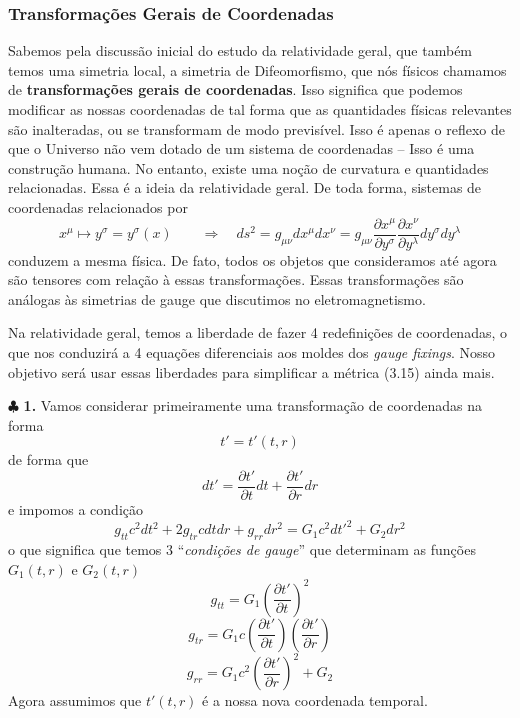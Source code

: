 \documentclass[11pt]{article}
\begin{document}
    \hypertarget{transformauxe7uxf5es-gerais-de-coordenadas}{%
\subsubsection{Transformações Gerais de
Coordenadas}\label{transformauxe7uxf5es-gerais-de-coordenadas}}

    Sabemos pela discussão inicial do estudo da relatividade geral, que
também temos uma simetria local, a simetria de Difeomorfismo, que nós
físicos chamamos de \textbf{transformações gerais de coordenadas}. Isso
significa que podemos modificar as nossas coordenadas de tal forma que
as quantidades físicas relevantes são inalteradas, ou se transformam de
modo previsível. Isso é apenas o reflexo de que o Universo não vem
dotado de um sistema de coordenadas -- Isso é uma construção humana. No
entanto, existe uma noção de curvatura e quantidades relacionadas. Essa
é a ideia da relatividade geral. De toda forma, sistemas de coordenadas
relacionados por
\[ \tag{3.16} x^\mu \mapsto y^\sigma = y^\sigma(x) \qquad \Rightarrow \quad ds^2 = g_{\mu\nu} dx^\mu dx^\nu = g_{\mu\nu} \frac{\partial x^\mu}{\partial y^\sigma} \frac{\partial x^\nu}{\partial y^\lambda} dy^\sigma dy^\lambda \]
conduzem a mesma física. De fato, todos os objetos que consideramos até
agora são tensores com relação à essas transformações. Essas
transformações são análogas às simetrias de gauge que discutimos no
eletromagnetismo.

Na relatividade geral, temos a liberdade de fazer 4 redefinições de
coordenadas, o que nos conduzirá a 4 equações diferenciais aos moldes
dos \emph{gauge fixings}. Nosso objetivo será usar essas liberdades para
simplificar a métrica (3.15) ainda mais.

    \(\clubsuit\) \textbf{1.} Vamos considerar primeiramente uma
transformação de coordenadas na forma \[ \tag{3.16.a} t' = t'(t,r) \] de
forma que
\[ \tag{3.16.b} dt' = \frac{\partial t'}{\partial t} dt +  \frac{\partial t'}{\partial r} dr \]
e impomos a condição
\[ \tag{3.17} g_{tt} c^2 dt^2 + 2 g_{tr} c dt dr + g_{rr} dr^2 = G_1 c^2 dt'^2 + G_2 dr^2 \]
o que significa que temos 3 ``\emph{condições de gauge}'' que determinam
as funções \(G_1(t,r)\) e \(G_2(t,r)\)
\[ \tag{3.18.a} g_{tt} = G_1 \left(\frac{\partial t'}{\partial t} \right)^2  \]
\[ \tag{3.18.a} g_{tr} = G_1 c \left(\frac{\partial t'}{\partial t} \right) \left(\frac{\partial t'}{\partial r} \right)  \]
\[ \tag{3.18.a} g_{rr} = G_1 c^2 \left(\frac{\partial t'}{\partial r} \right)^2 + G_2  \]
Agora assumimos que \(t'(t,r)\) é a nossa nova coordenada temporal.
\end{document}
